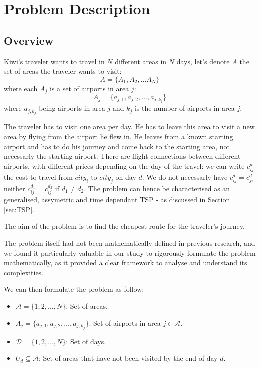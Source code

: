 \chapter{Problem Description}
\label{Chapter3}

\section{Overview}

Kiwi's traveler wants to travel in $N$ different areas in $N$ days, let's denote $A$ the set of areas the traveler wants to visit: \[A=\{A_{1}, A_{2}, \ldots A_{{N}}\}\]
where each \(A_{j}\) is a set of airports in area \(j\):
\[
    A_{j} = \{ a_{j,1}, a_{j,2}, \ldots, a_{j,k_j} \}
\]
where \( a_{j,k_j} \) being airports in area \(j\) and \(k_j\) is the number of airports in area \(j\).

The traveler has to visit one area per day. He has to leave this area to visit a new area by flying from the airport he flew in.
He leaves from a known starting airport and has to do his journey and come back to the starting area, not necessarly the starting airport.
There are flight connections between different airports, with different prices depending on the day of the travel:
we can write $c^{d}_{ij}$ the cost to travel from $city_i$ to $city_j$ on day $d$. We do not necessarly have $c^{d}_{ij}=c^{d}_{ji}$ neither $c^{d_1}_{ij}=c^{d_2}_{ij}$ if $d_1 \neq d_2$. The problem can hence be characterised as an generalised, assymetric and time dependant TSP - as discussed in Section \ref{sec:TSP}.

The aim of the problem is to find the cheapest route for the traveler's journey.

The problem itself had not been mathematically defined in previous research, and we found it particularly valuable in our study to rigorously formulate the problem mathematically, as it provided a clear framework to analyse and understand its complexities.

We can then formulate the problem as follow:

\begin{itemize}
    \item $\mathcal{A} = \{1, 2, \ldots, N\}$: Set of areas.
    \item $A_j = \{a_{j,1}, a_{j,2}, \ldots, a_{j,k_j}\}$: Set of airports in area $j \in \mathcal{A}$.
    \item $\mathcal{D} = \{1, 2, \ldots, N\}$: Set of days.
    \item $U_d \subseteq \mathcal{A}$: Set of areas that have not been visited by the end of day $d$.
\end{itemize}

